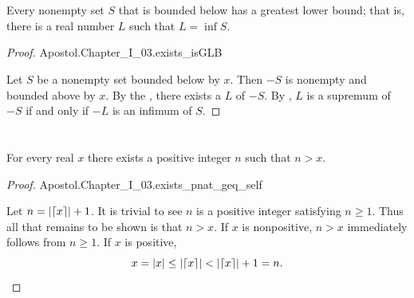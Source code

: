 \documentclass{report}
\begin{document}
\section{}
\label{sec:existence-greatest-lower-bound}
\label{sec:theorem-i.27}

\begin{theorem}[I.27]

  Every nonempty set $S$ that is bounded below has a greatest lower bound; that
    is, there is a real number $L$ such that $L = \inf{S}$.

\end{theorem}

\begin{proof}

    {Apostol.Chapter\_I\_03.exists\_isGLB}

  Let $S$ be a nonempty set bounded below by $x$.
  Then $-S$ is nonempty and bounded above by $x$.
  By the , there exists a
     $L$ of $-S$.
  By , $L$ is a supremum of $-S$ if and only if $-L$ is an
    infimum of $S$.

\end{proof}

\section{}%
\label{sec:positive-integers-unbounded-above}
\label{sec:theorem-i.29}

\begin{theorem}[I.29]

  For every real $x$ there exists a positive integer $n$ such that $n > x$.

\end{theorem}

\begin{proof}

    {Apostol.Chapter\_I\_03.exists\_pnat\_geq\_self}

  Let $n = \left|\left\lceil x\right\rceil\right| + 1$.
  It is trivial to see $n$ is a positive integer satisfying $n \geq 1$.
  Thus all that remains to be shown is that $n > x$.
  If $x$ is nonpositive, $n > x$ immediately follows from $n \geq 1$.
  If $x$ is positive,
    $$x = \left|x\right| \leq \left|\left\lceil x\right\rceil\right| < \left|\left\lceil x\right\rceil\right| + 1 = n.$$

\end{proof}
\end{document}
